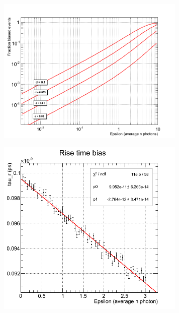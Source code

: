 


\begin{figure}[htbp]
\begin{center}
\includegraphics[width=9cm]{../Pictures/Chapter_6/bias_function.png}
\end{center}
\caption[]{}
\label{fig:bias_decay}
\end{figure}

\begin{figure}[htbp]
\begin{center}
\includegraphics[width=9cm]{../Pictures/Chapter_6/bias_rise.png}
\end{center}
\caption[]{}
\label{fig:bias_rise}
\end{figure}


